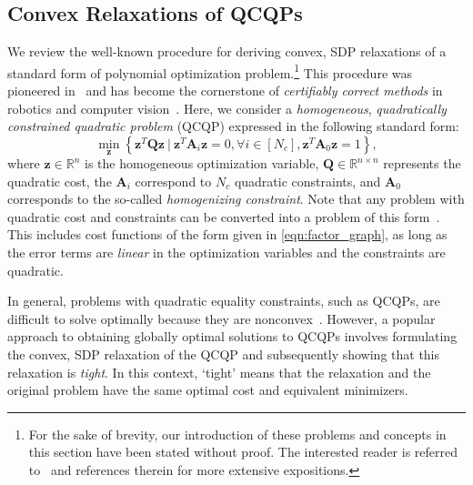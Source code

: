 \documentclass[lettersize,journal]{IEEEtran}
\newcommand{\indset}[1]{\left[#1\right]}
\begin{document}
\subsection{Convex Relaxations of QCQPs}\label{sec:Relaxation}

We review the well-known procedure for deriving convex, SDP relaxations of a standard form of polynomial optimization problem.\footnote{For the sake of brevity, our introduction of these problems and concepts in this section have been stated without proof. The interested reader is referred to~\cite{cifuentesLocalStabilitySemidefinite2022,vandenbergheSemidefiniteProgramming1996} and references therein for more extensive expositions.} This procedure was pioneered in~\cite{shorQuadraticOptimizationProblems1987} and has become the cornerstone of \textit{certifiably correct methods} in robotics and computer vision~\cite{rosenAdvancesInferenceRepresentation2021,brynteTightnessSemidefiniteRelaxations2022}. Here, we consider a \textit{homogeneous}, \textit{quadratically constrained quadratic problem} (QCQP) expressed in the following standard form:
\begin{equation}\label{opt:QCQP}
	\min\limits_{\bm{z}} \left\{ \bm{z}^T\bm{Q}\bm{z} ~\vert~ \bm{z}^T\bm{A}_i\bm{z} = 0,\forall i \in \indset{N_c}, \bm{z}^T\bm{A}_0\bm{z} = 1 \right\},
\end{equation}
where $ \bm{z}\in\mathbb{R}^n $ is the homogeneous optimization variable, $ \bm{Q}\in\mathbb{R}^{n\times n} $ represents the quadratic cost, the $ \bm{A}_i $ correspond to $ N_c $ quadratic constraints, and $ \bm{A}_0 $ corresponds to the so-called \emph{homogenizing constraint}\cite{cifuentesLocalStabilitySemidefinite2022}. Note that any problem with quadratic cost and constraints can be converted into a problem of this form~\cite{cifuentesLocalStabilitySemidefinite2022}. This includes cost functions of the form given in \eqref{eqn:factor_graph}, as long as the error terms are \emph{linear} in the optimization variables and the constraints are quadratic.

In general, problems with quadratic equality constraints, such as QCQPs, are difficult to solve optimally because they are nonconvex~\cite{boydConvexOptimization2004}. However, a popular approach to obtaining globally optimal solutions to QCQPs involves formulating the convex, SDP  relaxation of the QCQP and subsequently showing that this relaxation is \emph{tight}. In this context, `tight' means that the relaxation and the original problem have the same optimal cost and equivalent minimizers.
\end{document}
